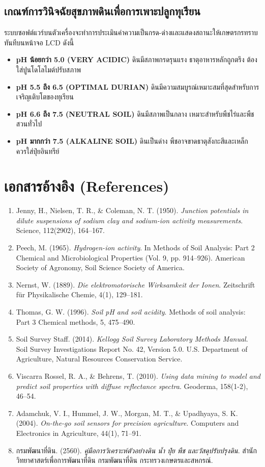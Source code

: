 \documentclass[12pt,a4paper,oneside]{report}
\begin{document}
\section{เกณฑ์การวินิจฉัยสุขภาพดินเพื่อการเพาะปลูกทุเรียน}
ระบบซอฟต์แวร์บนตัวเครื่องจะทำการประเมินค่าความเป็นกรด-ด่างและแสดงสถานะให้เกษตรกรทราบทันทีบนหน้าจอ LCD ดังนี้
\begin{itemize}
    \item \textbf{pH น้อยกว่า 5.0 (VERY ACIDIC)} ดินมีสภาพกรดรุนแรง ธาตุอาหารหลักถูกตรึง ต้องใส่ปูนโดโลไมต์ปรับสภาพ
    \item \textbf{pH 5.5 ถึง 6.5 (OPTIMAL DURIAN)} ดินมีความสมบูรณ์เหมาะสมที่สุดสำหรับการเจริญเติบโตของทุเรียน
    \item \textbf{pH 6.6 ถึง 7.5 (NEUTRAL SOIL)} ดินมีสภาพเป็นกลาง เหมาะสำหรับพืชไร่และพืชสวนทั่วไป
    \item \textbf{pH มากกว่า 7.5 (ALKALINE SOIL)} ดินเป็นด่าง พืชอาจขาดธาตุสังกะสีและเหล็ก ควรใส่ปุ๋ยอินทรีย์
\end{itemize}

\chapter*{เอกสารอ้างอิง (References)}

\begin{enumerate}
    \item Jenny, H., Nielsen, T. R., \& Coleman, N. T. (1950). \textit{Junction potentials in dilute suspensions of sodium clay and sodium-ion activity measurements}. Science, 112(2902), 164--167.
    \item Peech, M. (1965). \textit{Hydrogen-ion activity}. In Methods of Soil Analysis: Part 2 Chemical and Microbiological Properties (Vol. 9, pp. 914--926). American Society of Agronomy, Soil Science Society of America.
    \item Nernst, W. (1889). \textit{Die elektromotorische Wirksamkeit der Ionen}. Zeitschrift f\"ur Physikalische Chemie, 4(1), 129--181.
    \item Thomas, G. W. (1996). \textit{Soil pH and soil acidity}. Methods of soil analysis: Part 3 Chemical methods, 5, 475--490.
    \item Soil Survey Staff. (2014). \textit{Kellogg Soil Survey Laboratory Methods Manual}. Soil Survey Investigations Report No. 42, Version 5.0. U.S. Department of Agriculture, Natural Resources Conservation Service.
    \item Viscarra Rossel, R. A., \& Behrens, T. (2010). \textit{Using data mining to model and predict soil properties with diffuse reflectance spectra}. Geoderma, 158(1-2), 46--54.
    \item Adamchuk, V. I., Hummel, J. W., Morgan, M. T., \& Upadhyaya, S. K. (2004). \textit{On-the-go soil sensors for precision agriculture}. Computers and Electronics in Agriculture, 44(1), 71--91.
    \item กรมพัฒนาที่ดิน. (2560). \textit{คู่มือการวิเคราะห์ตัวอย่างดิน น้ำ ปุ๋ย พืช และวัสดุปรับปรุงดิน}. สำนักวิทยาศาสตร์เพื่อการพัฒนาที่ดิน กรมพัฒนาที่ดิน กระทรวงเกษตรและสหกรณ์.
\end{enumerate}
\end{document}
